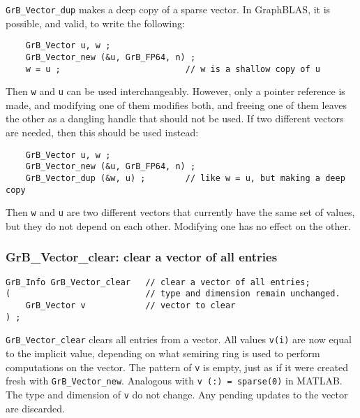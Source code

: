 \documentclass[12pt]{article}
\begin{document}
\verb'GrB_Vector_dup' makes a deep copy of a sparse vector.
In GraphBLAS, it is possible, and valid, to write the following:

    {\footnotesize
    \begin{verbatim}
    GrB_Vector u, w ;
    GrB_Vector_new (&u, GrB_FP64, n) ;
    w = u ;                         // w is a shallow copy of u  \end{verbatim}}

Then \verb'w' and \verb'u' can be used interchangeably.  However, only a pointer
reference is made, and modifying one of them modifies both, and freeing one of
them leaves the other as a dangling handle that should not be used.
If two different vectors are needed, then this should be used instead:

    {\footnotesize
    \begin{verbatim}
    GrB_Vector u, w ;
    GrB_Vector_new (&u, GrB_FP64, n) ;
    GrB_Vector_dup (&w, u) ;        // like w = u, but making a deep copy \end{verbatim}}

Then \verb'w' and \verb'u' are two different vectors that currently have the
same set of values, but they do not depend on each other.  Modifying one has
no effect on the other.

\subsubsection{{\sf GrB\_Vector\_clear:}         clear a vector of all entries}
\label{vector_clear}

\begin{mdframed}[userdefinedwidth=6in]
{\footnotesize
\begin{verbatim}
GrB_Info GrB_Vector_clear   // clear a vector of all entries;
(                           // type and dimension remain unchanged.
    GrB_Vector v            // vector to clear
) ;
\end{verbatim}
} \end{mdframed}

\verb'GrB_Vector_clear' clears all entries from a vector.  All values
\verb'v(i)' are now equal to the implicit value, depending on what semiring
ring is used to perform computations on the vector.  The pattern of \verb'v' is
empty, just as if it were created fresh with \verb'GrB_Vector_new'.  Analogous
with \verb'v (:) = sparse(0)' in MATLAB.  The type and dimension of \verb'v' do
not change.  Any pending updates to the vector are discarded.
\end{document}
